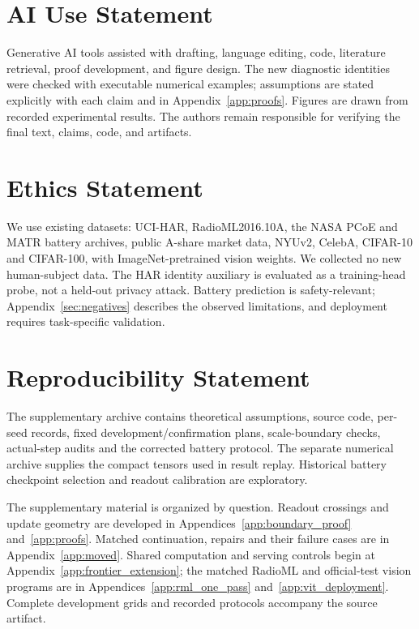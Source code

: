 \documentclass{article}
\begin{document}
\clearpage
\section*{AI Use Statement}
Generative AI tools assisted with drafting, language editing, code, literature retrieval, proof development, and figure design. The new diagnostic identities were checked with executable numerical examples; assumptions are stated explicitly with each claim and in Appendix~\ref{app:proofs}. Figures are drawn from recorded experimental results. The authors remain responsible for verifying the final text, claims, code, and artifacts.

\section*{Ethics Statement}
We use existing datasets: UCI-HAR, RadioML2016.10A, the NASA PCoE and MATR battery archives, public A-share market data, NYUv2, CelebA, CIFAR-10 and CIFAR-100, with ImageNet-pretrained vision weights. We collected no new human-subject data. The HAR identity auxiliary is evaluated as a training-head probe, not a held-out privacy attack. Battery prediction is safety-relevant; Appendix~\ref{sec:negatives} describes the observed limitations, and deployment requires task-specific validation.


\section*{Reproducibility Statement}
The supplementary archive contains theoretical assumptions, source code,
per-seed records, fixed development/confirmation plans, scale-boundary checks,
actual-step audits and the corrected battery protocol. The separate numerical
archive supplies the compact tensors used in result replay. Historical battery
checkpoint selection and readout calibration are exploratory.





\clearpage
\appendix

The supplementary material is organized by question. Readout crossings and
update geometry are developed in Appendices~\ref{app:boundary_proof}
and~\ref{app:proofs}. Matched continuation, repairs and their failure cases
are in Appendix~\ref{app:moved}. Shared computation and serving controls
begin at Appendix~\ref{app:frontier_extension}; the matched RadioML and
official-test vision programs are in Appendices~\ref{app:rml_one_pass}
and~\ref{app:vit_deployment}. Complete development grids and recorded
protocols accompany the source artifact.
\end{document}
